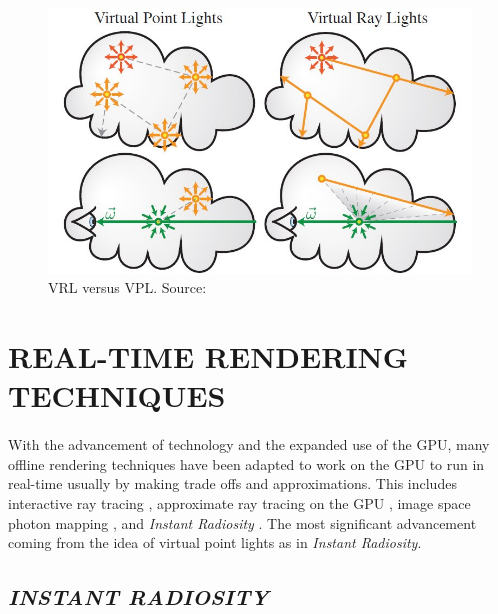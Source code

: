 \begin{figure}[h!]
  \centering
    \includegraphics[width=1.0\textwidth]{vrl.jpg}
  \caption{VRL versus VPL. Source: \protect\cite{Novak2012}}
	\label{fig:vrl}
\end{figure}

\section{REAL-TIME RENDERING TECHNIQUES} \label{sec:RT}
\paragraph{}
With the advancement of technology and the expanded use of the GPU, many offline rendering techniques have been adapted to work on the GPU to run in real-time usually by making trade offs and approximations.  This includes interactive ray tracing \cite{Wald2002}, approximate ray tracing on the GPU \cite{Kalos2005}, image space photon mapping \cite{McGuire2009}, and \textit{Instant Radiosity} \cite{Keller1997}.  The most significant advancement coming from the idea of virtual point lights as in \textit{Instant Radiosity}.

\subsection{\textit{INSTANT RADIOSITY}} \label{sec:instantradiosity}
